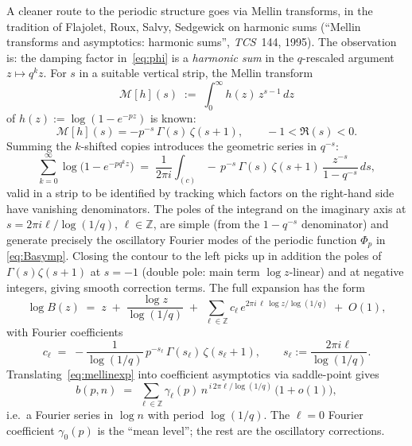 \documentclass[11pt]{article}
\theoremstyle{definition}
\begin{document}
A cleaner route to the periodic structure goes via Mellin transforms, in
the tradition of Flajolet, Roux, Salvy, Sedgewick on harmonic sums
(``Mellin transforms and asymptotics: harmonic sums'', \emph{TCS}~144,
1995). The observation is: the damping factor in~\eqref{eq:phi} is a
\emph{harmonic sum} in the $q$-rescaled argument $z\mapsto q^kz$.
For $s$ in a suitable vertical strip, the Mellin transform
\[
  \mathcal{M}[h](s)\;:=\;\int_0^\infty h(z)\,z^{s-1}\,dz
\]
of $h(z):=\log(1-e^{-pz})$ is known:
\[
  \mathcal{M}[h](s) = -p^{-s}\,\Gamma(s)\,\zeta(s+1),\qquad -1<\Re(s)<0.
\]
Summing the $k$-shifted copies introduces the geometric series in $q^{-s}$:
\[
  \sum_{k=0}^{\infty}\log\!\bigl(1-e^{-p q^k z}\bigr)\;
  =\;\frac{1}{2\pi i}\int_{(c)}\!-\,p^{-s}\,\Gamma(s)\,\zeta(s+1)\,
   \frac{z^{-s}}{1-q^{-s}}\,ds,
\]
valid in a strip to be identified by tracking which factors on the
right-hand side have vanishing denominators. The poles of the integrand
on the imaginary axis at $s = 2\pi i\ell/\log(1/q)$, $\ell\in\mathbb{Z}$,
are simple (from the $1-q^{-s}$ denominator) and generate precisely
the oscillatory Fourier modes of the periodic function $\Phi_p$ in
\eqref{eq:Basymp}. Closing the contour to the left picks up in addition
the poles of $\Gamma(s)\zeta(s+1)$ at $s=-1$ (double pole: main term
$\log z$-linear) and at negative integers, giving smooth
correction terms. The full expansion has the form
\begin{equation}\label{eq:mellinexp}
  \log B(z) \;=\; z
   \;+\; \frac{\log z}{\log(1/q)}
   \;+\; \sum_{\ell\in\mathbb{Z}} c_\ell\, e^{2\pi i\,\ell\,\log z/\log(1/q)}
   \;+\; O(1),
\end{equation}
with Fourier coefficients
\[
  c_\ell \;=\; -\frac{1}{\log(1/q)}\,p^{-s_\ell}\,\Gamma(s_\ell)\,\zeta(s_\ell+1),
  \qquad s_\ell := \frac{2\pi i\ell}{\log(1/q)}.
\]
Translating~\eqref{eq:mellinexp} into coefficient asymptotics via
saddle-point gives
\begin{equation}\label{eq:fourier}
  \boxed{\;b(p,n) \;=\; \sum_{\ell\in\mathbb{Z}} \gamma_\ell(p)\,n^{\,i\,2\pi\ell/\log(1/q)}\,\bigl(1+o(1)\bigr),\;}
\end{equation}
i.e.\ a Fourier series in $\log n$ with period $\log(1/q)$. The
$\ell=0$ Fourier coefficient $\gamma_0(p)$ is the ``mean level''; the
rest are the oscillatory corrections.
\end{document}

